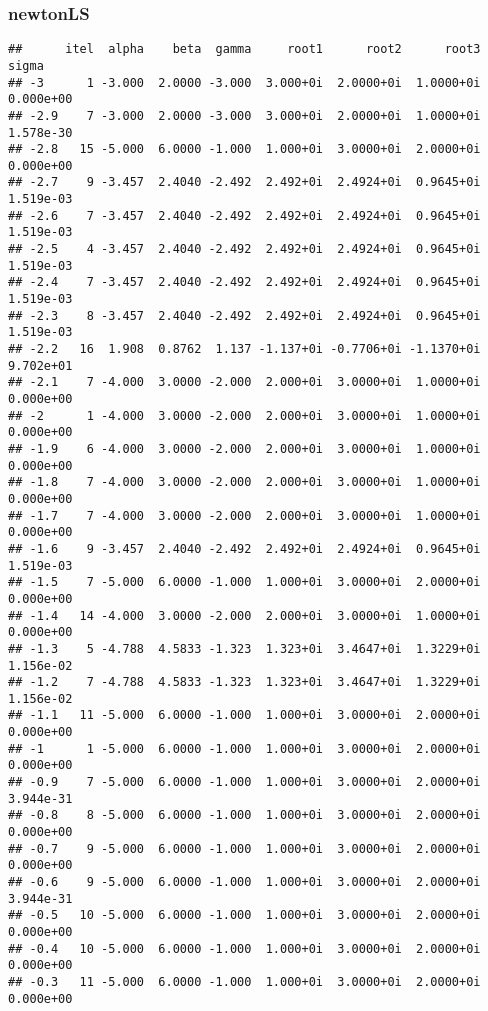 \documentclass[
  12pt,
]{article}
\begin{document}
\normalsize

\subsubsection{newtonLS}\label{newtonls}

\footnotesize

\begin{verbatim}
##      itel  alpha    beta  gamma     root1      root2      root3     sigma
## -3      1 -3.000  2.0000 -3.000  3.000+0i  2.0000+0i  1.0000+0i 0.000e+00
## -2.9    7 -3.000  2.0000 -3.000  3.000+0i  2.0000+0i  1.0000+0i 1.578e-30
## -2.8   15 -5.000  6.0000 -1.000  1.000+0i  3.0000+0i  2.0000+0i 0.000e+00
## -2.7    9 -3.457  2.4040 -2.492  2.492+0i  2.4924+0i  0.9645+0i 1.519e-03
## -2.6    7 -3.457  2.4040 -2.492  2.492+0i  2.4924+0i  0.9645+0i 1.519e-03
## -2.5    4 -3.457  2.4040 -2.492  2.492+0i  2.4924+0i  0.9645+0i 1.519e-03
## -2.4    7 -3.457  2.4040 -2.492  2.492+0i  2.4924+0i  0.9645+0i 1.519e-03
## -2.3    8 -3.457  2.4040 -2.492  2.492+0i  2.4924+0i  0.9645+0i 1.519e-03
## -2.2   16  1.908  0.8762  1.137 -1.137+0i -0.7706+0i -1.1370+0i 9.702e+01
## -2.1    7 -4.000  3.0000 -2.000  2.000+0i  3.0000+0i  1.0000+0i 0.000e+00
## -2      1 -4.000  3.0000 -2.000  2.000+0i  3.0000+0i  1.0000+0i 0.000e+00
## -1.9    6 -4.000  3.0000 -2.000  2.000+0i  3.0000+0i  1.0000+0i 0.000e+00
## -1.8    7 -4.000  3.0000 -2.000  2.000+0i  3.0000+0i  1.0000+0i 0.000e+00
## -1.7    7 -4.000  3.0000 -2.000  2.000+0i  3.0000+0i  1.0000+0i 0.000e+00
## -1.6    9 -3.457  2.4040 -2.492  2.492+0i  2.4924+0i  0.9645+0i 1.519e-03
## -1.5    7 -5.000  6.0000 -1.000  1.000+0i  3.0000+0i  2.0000+0i 0.000e+00
## -1.4   14 -4.000  3.0000 -2.000  2.000+0i  3.0000+0i  1.0000+0i 0.000e+00
## -1.3    5 -4.788  4.5833 -1.323  1.323+0i  3.4647+0i  1.3229+0i 1.156e-02
## -1.2    7 -4.788  4.5833 -1.323  1.323+0i  3.4647+0i  1.3229+0i 1.156e-02
## -1.1   11 -5.000  6.0000 -1.000  1.000+0i  3.0000+0i  2.0000+0i 0.000e+00
## -1      1 -5.000  6.0000 -1.000  1.000+0i  3.0000+0i  2.0000+0i 0.000e+00
## -0.9    7 -5.000  6.0000 -1.000  1.000+0i  3.0000+0i  2.0000+0i 3.944e-31
## -0.8    8 -5.000  6.0000 -1.000  1.000+0i  3.0000+0i  2.0000+0i 0.000e+00
## -0.7    9 -5.000  6.0000 -1.000  1.000+0i  3.0000+0i  2.0000+0i 0.000e+00
## -0.6    9 -5.000  6.0000 -1.000  1.000+0i  3.0000+0i  2.0000+0i 3.944e-31
## -0.5   10 -5.000  6.0000 -1.000  1.000+0i  3.0000+0i  2.0000+0i 0.000e+00
## -0.4   10 -5.000  6.0000 -1.000  1.000+0i  3.0000+0i  2.0000+0i 0.000e+00
## -0.3   11 -5.000  6.0000 -1.000  1.000+0i  3.0000+0i  2.0000+0i 0.000e+00

\end{verbatim}
\end{document}
